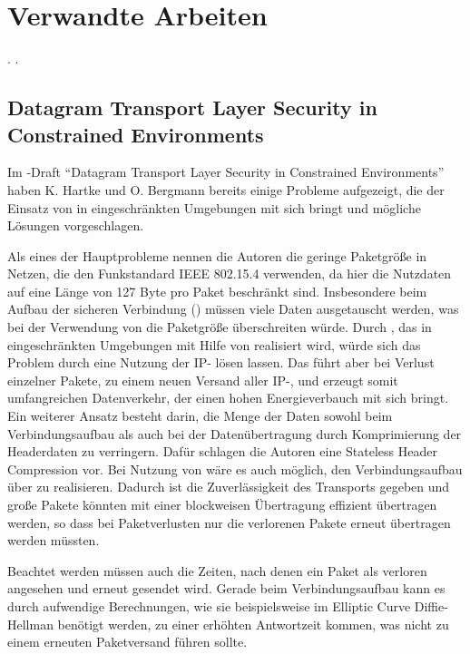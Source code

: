 \section{Verwandte Arbeiten}

.  .

\subsection{Datagram Transport Layer Security in Constrained Environments}
Im -Draft "`Datagram Transport Layer Security in Constrained Environments"' \cite{draftcodtls} haben K. Hartke und O. Bergmann
bereits einige Probleme aufgezeigt, die der Einsatz von  in eingeschränkten Umgebungen mit sich bringt und mögliche Lösungen vorgeschlagen.

Als eines der Hauptprobleme nennen die Autoren die geringe Paketgröße in Netzen, die den Funkstandard IEEE 802.15.4 \cite{ieee802154} verwenden,
da hier die Nutzdaten auf eine Länge von 127 Byte pro Paket beschränkt sind. Insbesondere beim Aufbau der sicheren Verbindung () müssen
viele Daten ausgetauscht werden, was bei der Verwendung von  die Paketgröße überschreiten würde. Durch  \cite{rfc2460}, das in
eingeschränkten Umgebungen mit Hilfe von  \cite{rfc4944} realisiert wird, würde sich das Problem durch eine Nutzung der IP-
lösen lassen. Das führt aber bei Verlust einzelner Pakete, zu einem neuen Versand aller IP-, und erzeugt somit umfangreichen Datenverkehr,
der einen hohen Energieverbauch mit sich bringt. Ein weiterer Ansatz besteht darin, die Menge der Daten sowohl beim Verbindungsaufbau als auch bei der
Datenübertragung durch Komprimierung der Headerdaten zu verringern. Dafür schlagen die Autoren eine Stateless Header Compression vor. Bei Nutzung von
 wäre es auch möglich, den Verbindungsaufbau über  zu realisieren. Dadurch ist die Zuverlässigkeit des Transports gegeben und große Pakete
könnten mit einer blockweisen Übertragung effizient übertragen werden, so dass bei Paketverlusten nur die verlorenen Pakete erneut übertragen werden müssten.

Beachtet werden müssen auch die Zeiten, nach denen ein Paket als verloren angesehen und erneut gesendet wird. Gerade beim Verbindungsaufbau
kann es durch aufwendige Berechnungen, wie sie beispielsweise im Elliptic Curve Diffie-Hellman benötigt werden, zu einer erhöhten
Antwortzeit kommen, was nicht zu einem erneuten Paketversand führen sollte.

